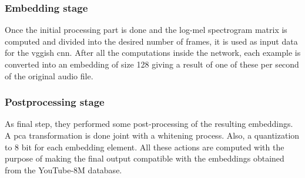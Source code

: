 \subsubsection*{Embedding stage}

	Once the initial processing part is done and the log-mel spectrogram matrix is computed and divided into the desired number of frames, it is used as input data for the \acrshort{vgg}ish \acrshort{cnn}. After all the computations inside the network, each example is converted into an embedding of size 128 giving a result of one of these per second of the original audio file.

\subsubsection*{Postprocessing stage}

	As final step, they performed some post-processing of the resulting embeddings. A \acrfull{pca} \cite{Abdi2010} transformation is done joint with a whitening process. Also, a quantization to 8 bit for each embedding element. All these actions are computed with the purpose of making the final output compatible with the embeddings obtained from the YouTube-8M database.

